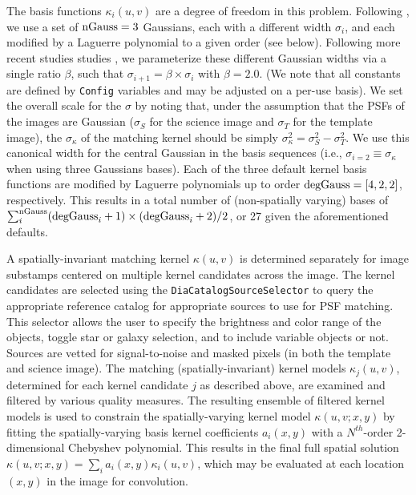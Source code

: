 The basis functions $\kappa_i(u,v)$ are a degree of freedom in this problem. Following \citep{Alard98}, we use a set of $\rm nGauss = 3$ Gaussians, each with a different width $\sigma_i$, and each modified by a Laguerre polynomial to a given order (see below). Following more recent studies studies \citep[e.g.][]{Israel07}, we parameterize these different Gaussian widths via a single ratio $\beta$, such that $\sigma_{i+1} = \beta \times \sigma_{i}$ with $\beta = 2.0$. (We note that all constants are defined by {\tt Config} variables and may be adjusted on a per-use basis). We set the overall scale for the $\sigma$ by noting that, under the assumption that the PSFs of the images are Gaussian ($\sigma_S$ for the science image and $\sigma_T$ for the template image), the $\sigma_{\kappa}$ of the matching kernel should be simply $\sigma_{\kappa}^2 = \sigma_S^2 - \sigma_T^2$. We use this canonical width for the central Gaussian in the basis sequences (i.e., $\sigma_{i=2} \equiv \sigma_{\kappa}$ when using three Gaussians bases). Each of the three default kernel basis functions are modified by Laguerre polynomials up to order $\rm degGauss = [4, 2,   2]$, respectively. This results in a total number of (non-spatially varying) bases of $\sum_i^{\rm nGauss} ({\rm degGauss}_i+1)\times({\rm   degGauss}_i+2)/2$, or 27 given the aforementioned defaults. 

A spatially-invariant matching kernel $\kappa(u,v)$ is determined separately for image substamps centered on multiple kernel candidates across the image. The kernel candidates are selected using the {\tt   DiaCatalogSourceSelector} to query the appropriate reference catalog for appropriate sources to use for PSF matching. This selector allows the user to specify the brightness and color range of the objects, toggle star or galaxy selection, and to include variable objects or not. Sources are vetted for signal-to-noise and masked pixels (in both the template and science image). The matching (spatially-invariant) kernel models $\kappa_j(u,v)$, determined for each kernel candidate $j$ as described above, are examined and filtered by various quality measures. The resulting ensemble of filtered kernel models is used to constrain the spatially-varying kernel model $\kappa(u,v;x,y)$ by fitting the spatially-varying basis kernel coefficients $a_i(x,y)$ with a $N^{th}$-order 2-dimensional Chebyshev polynomial. This results in the final full spatial solution $\kappa(u,v;x,y) = \sum_i a_i(x,y) \kappa_i(u,v)$, which may be evaluated at each location $(x,y)$ in the image for convolution. 

